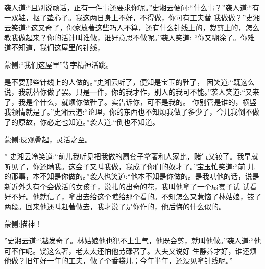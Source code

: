 \begin{parag}
    袭人道:“且别说顽话，正有一件事还要求你呢。”史湘云便问:“什么事？”袭人道:“有一双鞋，抠了垫心子。我这两日身上不好，不得做，你可有工夫替 我做做？”史湘云笑道:“这又奇了，你家放著这些巧人不算，还有什么针线上的，裁剪上的，怎么教我做起来？你的活计叫谁做，谁好意思不做呢。”袭人笑道: “你又糊涂了。你难道不知道，我们这屋里的针线，\begin{note}蒙侧:“我们这屋里”等字精神活跳。\end{note}是不要那些针线上的人做的。”史湘云听了，便知是宝玉的鞋了， 因笑道:“既这么说，我就替你做了罢。只是一件，你的我才作，别人的我可不能。”袭人笑道:“又来了，我是个什么，就烦你做鞋了。实告诉你，可不是我的。 你别管是谁的，横竖我领情就是了。”史湘云道:“论理，你的东西也不知烦我做了多少了，今儿我倒不做了的原故，你必定也知道。”袭人道:“倒也不知道。\begin{note}蒙侧:反观叠起，灵活之至。\end{note}” 史湘云冷笑道:“前儿我听见把我做的扇套子拿著和人家比，赌气又铰了。我早就听见了，你还瞒我。这会子又叫我做，我成了你们的奴才了。”宝玉忙笑道:“前 儿的那事，本不知是你做的。”袭人也笑道:“他本不知是你做的。是我哄他的话，说是新近外头有个会做活的女孩子，说扎的出奇的花，我叫他拿了一个扇套子试 试看好不好。他就信了，拿出去给这个瞧给那个看的。不知怎么又惹恼了林姑娘，铰了两段。回来他还叫赶著做去，我才说了是你作的，他后悔的什么似的。\begin{note}蒙侧:描神！\end{note}”史湘云道:“越发奇了。林姑娘他也犯不上生气，他既会剪，就叫他做。”袭人道:“他可不作呢。饶这么著，老太太还怕他劳碌著了。大夫又说好 生静养才好，谁还烦他做？旧年好一年的工夫，做了个香袋儿；今年半年，还没见拿针线呢。”
\end{parag}


